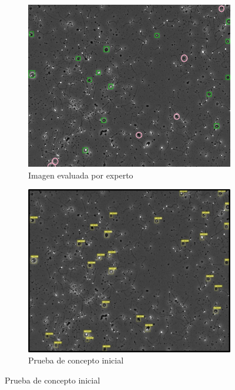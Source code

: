 \documentclass[12pt,a4paper,onecolumn,oneside]{report}
\begin{document}
\begin{figure}[H]
  \centering
  \begin{subfigure}[b]{0.48\textwidth}
    \centering
    \includegraphics[width=\textwidth]{figuras/evaluacion_cualitativa/7/7.jpg}
    \caption{Imagen evaluada por experto}
    \label{fig:exp_image_7}
  \end{subfigure}
  \hfill
  \begin{subfigure}[b]{0.48\textwidth}
    \centering
    \includegraphics[width=\textwidth]{figuras/evaluacion_cualitativa/7/7_v7.jpg}
    \caption{Prueba de concepto inicial}
    \label{fig:poc_image_7}
  \end{subfigure}
  

\end{figure}
\end{document}
